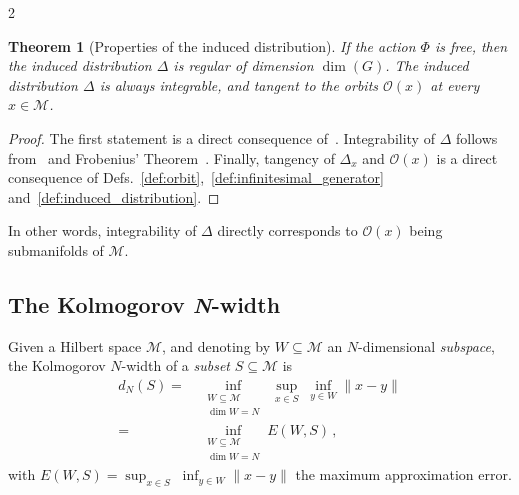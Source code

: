 \documentclass{article}
\newtheorem{theorem}{Theorem}[section]
\newtheorem{proof}{Proof}[theorem]
\newcommand{\M}{\mathcal{M}}                                %
\newcommand{\g}{\mathfrak{g}}                               %
\newcommand{\state}{x}
\begin{document}
\begin{multicols}{2}
\begin{theorem}[Properties of the induced distribution]\label{thm:properties_of_induced_distribution}
    If the action $\Phi$ is free, then the induced distribution $\Delta$ is regular of dimension $\dim(G)$. %
    The induced distribution $\Delta$ is always integrable, and tangent to the orbits $\mathcal{O}(\state)$ at every $\state\in\M$. %
\end{theorem}

\begin{proof}
    The first statement is a direct consequence of~\cite[Proposition 7.26]{Lee2012}. Integrability of $\Delta$ follows from~\cite[Proposition 19.2]{Lee2012} and Frobenius' Theorem~\cite[Theorem 19.12]{Lee2012}. Finally, tangency of $\Delta_x$ and $\mathcal{O}(\state)$ is a direct consequence of Defs.~\ref{def:orbit},~\ref{def:infinitesimal_generator} and~\ref{def:induced_distribution}. %
\end{proof}

In other words, integrability of $\Delta$ directly corresponds to $\mathcal{O}(\state)$ being submanifolds of $\M$.


\subsection{The Kolmogorov \textit{N}-width}\label{ssec:Kolmogorov-N-width}
Given a Hilbert space $\M$, and denoting by $W\subseteq\M$ an $N$-dimensional \textit{subspace}, the Kolmogorov $N$-width of a \textit{subset} $S \subseteq \M$ is 
\begin{align}\label{eq:Kolmogorov-N-width}
    d_N(S) = &\, \inf_{\substack{W \subseteq \M  \\ \dim W = N}} \; \sup_{\state \in S} \; \inf_{y\in W} \| \state - y\| \\
    = &\,  \inf_{\substack{W \subseteq \M  \\ \dim W = N}} E(W,S) \nonumber \,,
\end{align}
with $E(W,S) = \sup_{\state \in S} \; \inf_{y\in W} \| \state - y\|$ the maximum approximation error.


\end{multicols}
\end{document}
